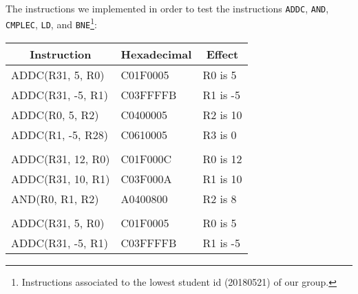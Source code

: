 \documentclass[a4paper, 11pt, oneside]{article}
\begin{document}
\paragraph{}The instructions we implemented in order to test the instructions \texttt{ADDC}, \texttt{AND}, \texttt{CMPLEC}, \texttt{LD}, and \texttt{BNE}\footnote{Instructions associated to the lowest student id (20180521) of our group.}:
\begin{table}[!ht]
\centering
\begin{tabular}{|l|l|l|}
\hline
\multicolumn{1}{|c|}{\textbf{Instruction}} & \multicolumn{1}{c|}{\textbf{Hexadecimal}} & \multicolumn{1}{c|}{\textbf{Effect}}  \\ \hline
ADDC(R31, 5, R0)                           & C01F0005                                  & R0 is 5                               \\ \hline
ADDC(R31, -5, R1)                          & C03FFFFB                                  & R1 is -5                              \\ \hline
ADDC(R0, 5, R2)                            & C0400005                                  & R2 is 10                              \\ \hline
ADDC(R1, -5, R28)                          & C0610005                                  & R3 is 0                               \\ \hline
                                           &                                           &                                       \\ \hline
ADDC(R31, 12, R0)                          & C01F000C                                  & R0 is 12                              \\ \hline
ADDC(R31, 10, R1)                          & C03F000A                                  & R1 is 10                              \\ \hline
AND(R0, R1, R2)                            & A0400800                                  & R2 is 8                               \\ \hline
                                           &                                           &                                       \\ \hline
ADDC(R31, 5, R0)                           & C01F0005                                  & R0 is 5                               \\ \hline
ADDC(R31, -5, R1)                          & C03FFFFB                                  & R1 is -5                              \\ \hline

\end{tabular}
\end{table}
\end{document}
